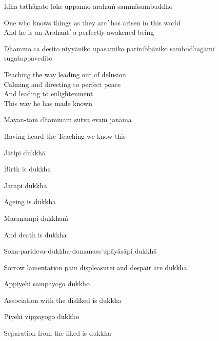 Idha tathāgato loke uppanno arahaṁ sammāsambuddho

\begin{cprenglish}
One who knows things as they are  ̓  has arisen in this world\\
And he is an Arahant  ̓  a perfectly awakened being
\end{cprenglish}

Dhammo ca desito niyyāniko upasamiko parinibbāniko sambodhagāmī sugatappavedito

\begin{cprenglish}
Teaching the way leading out of delusion\\
Calming and directing to perfect peace\\
And leading to enlightenment\\
This way he has made known\\
\end{cprenglish}

Mayan-taṁ dhammaṁ sutvā evaṁ jānāma

\begin{cprenglish}
Having heard the Teaching we know this
\end{cprenglish}

Jātipi dukkhā

\begin{cprenglish}
Birth is dukkha
\end{cprenglish}

Jarāpi dukkhā

\begin{cprenglish}
Ageing is dukkha
\end{cprenglish}

Maraṇampi dukkhaṁ

\begin{cprenglish}
And death is dukkha
\end{cprenglish}

Soka-parideva-dukkha-domanass'upāyāsāpi dukkhā

\begin{cprenglish}
Sorrow lamentation pain displeasurei and despair are dukkha
\end{cprenglish}

Appiyehi sampayogo dukkho

\begin{cprenglish}
Association with the disliked is dukkha
\end{cprenglish}

Piyehi vippayogo dukkho

\begin{cprenglish}
Separation from the liked is dukkha
\end{cprenglish}

